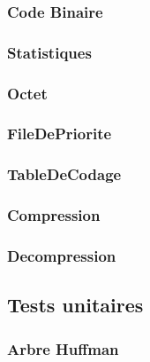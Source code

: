 \documentclass{article}
\begin{document}
\subsubsection{\textbf{Code Binaire}}


\subsubsection{\textbf{Statistiques}}


\subsubsection{\textbf{Octet}}


\subsubsection{\textbf{FileDePriorite}}


\subsubsection{\textbf{TableDeCodage}}


\subsubsection{\textbf{Compression}}


\subsubsection{\textbf{Decompression}}


\subsection{Tests unitaires}

\subsubsection{\textbf{Arbre Huffman}}

\end{document}
